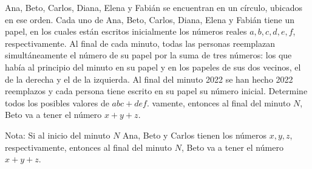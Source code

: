 Ana, Beto, Carlos, Diana, Elena y Fabián se encuentran en un círculo, ubicados en ese orden. Cada uno de Ana, Beto, Carlos, Diana, Elena y Fabián tiene un papel, en los cuales están escritos inicialmente los números reales $a, b, c, d, e, f$, respectivamente. Al final de cada minuto, todas las personas reemplazan simultáneamente el número de su papel por la suma de tres números: los que había al principio del minuto en su papel y en los papeles de sus dos vecinos, el de la derecha y el de la izquierda. Al final del minuto 2022 se han hecho 2022 reemplazos y cada persona tiene escrito en su papel su número inicial. Determine todos los posibles valores de $abc + def$.
vamente, entonces al final del minuto $N$, Beto va a tener el número $x + y + z$. \newline 

Nota: Si al inicio del minuto $N$ Ana, Beto y Carlos tienen los números $x,y,z$, respectivamente, entonces al final del minuto $N$, Beto va a tener el número $x + y + z$.